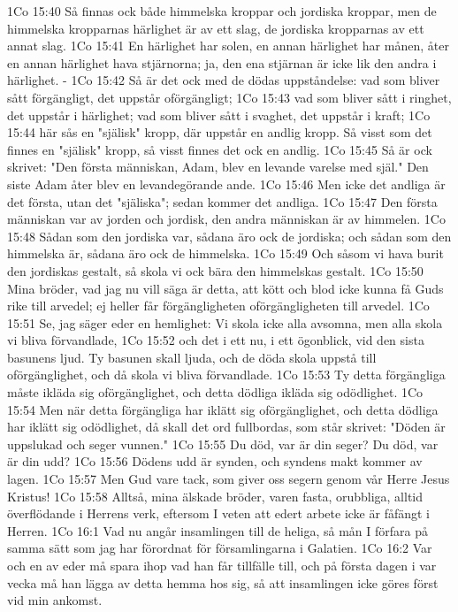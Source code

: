 1Co 15:40  Så finnas ock både himmelska kroppar och jordiska kroppar, men de himmelska kropparnas härlighet är av ett slag, de jordiska kropparnas av ett annat slag.
1Co 15:41  En härlighet har solen, en annan härlighet har månen, åter en annan härlighet hava stjärnorna; ja, den ena stjärnan är icke lik den andra i härlighet. -
1Co 15:42  Så är det ock med de dödas uppståndelse: vad som bliver sått förgängligt, det uppstår oförgängligt;
1Co 15:43  vad som bliver sått i ringhet, det uppstår i härlighet; vad som bliver sått i svaghet, det uppstår i kraft;
1Co 15:44  här sås en "själisk" kropp, där uppstår en andlig kropp. Så visst som det finnes en "själisk" kropp, så visst finnes det ock en andlig.
1Co 15:45  Så är ock skrivet: "Den första människan, Adam, blev en levande varelse med själ." Den siste Adam åter blev en levandegörande ande.
1Co 15:46  Men icke det andliga är det första, utan det "själiska"; sedan kommer det andliga.
1Co 15:47  Den första människan var av jorden och jordisk, den andra människan är av himmelen.
1Co 15:48  Sådan som den jordiska var, sådana äro ock de jordiska; och sådan som den himmelska är, sådana äro ock de himmelska.
1Co 15:49  Och såsom vi hava burit den jordiskas gestalt, så skola vi ock bära den himmelskas gestalt.
1Co 15:50  Mina bröder, vad jag nu vill säga är detta, att kött och blod icke kunna få Guds rike till arvedel; ej heller får förgängligheten oförgängligheten till arvedel.
1Co 15:51  Se, jag säger eder en hemlighet: Vi skola icke alla avsomna, men alla skola vi bliva förvandlade,
1Co 15:52  och det i ett nu, i ett ögonblick, vid den sista basunens ljud. Ty basunen skall ljuda, och de döda skola uppstå till oförgänglighet, och då skola vi bliva förvandlade.
1Co 15:53  Ty detta förgängliga måste ikläda sig oförgänglighet, och detta dödliga ikläda sig odödlighet.
1Co 15:54  Men när detta förgängliga har iklätt sig oförgänglighet, och detta dödliga har iklätt sig odödlighet, då skall det ord fullbordas, som står skrivet: "Döden är uppslukad och seger vunnen."
1Co 15:55  Du död, var är din seger? Du död, var är din udd?
1Co 15:56  Dödens udd är synden, och syndens makt kommer av lagen.
1Co 15:57  Men Gud vare tack, som giver oss segern genom vår Herre Jesus Kristus!
1Co 15:58  Alltså, mina älskade bröder, varen fasta, orubbliga, alltid överflödande i Herrens verk, eftersom I veten att edert arbete icke är fåfängt i Herren.
1Co 16:1  Vad nu angår insamlingen till de heliga, så mån I förfara på samma sätt som jag har förordnat för församlingarna i Galatien.
1Co 16:2  Var och en av eder må spara ihop vad han får tillfälle till, och på första dagen i var vecka må han lägga av detta hemma hos sig, så att insamlingen icke göres först vid min ankomst.
